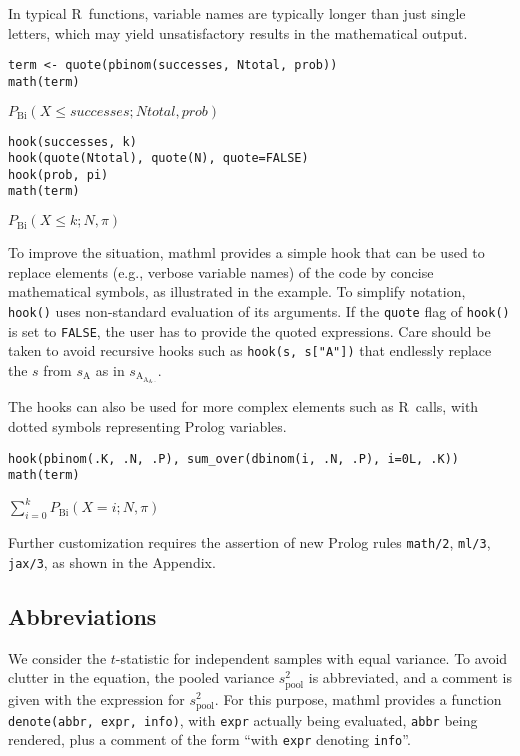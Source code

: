 In typical R~functions, variable names are typically longer than just
single letters, which may yield unsatisfactory results in the
mathematical output.

\begin{verbatim}
term <- quote(pbinom(successes, Ntotal, prob))
math(term)
\end{verbatim}

\({P}_{\mathrm{Bi}}{\left({{X}{\le}{successes}}{{;}{{Ntotal}{{,}{prob}}}}\right)}\)

\begin{verbatim}
hook(successes, k)
hook(quote(Ntotal), quote(N), quote=FALSE)
hook(prob, pi)
math(term)
\end{verbatim}

\({P}_{\mathrm{Bi}}{\left({{X}{\le}{k}}{{;}{{N}{{,}{\pi}}}}\right)}\)

To improve the situation, mathml provides a simple hook that can be used
to replace elements (e.g., verbose variable names) of the code by
concise mathematical symbols, as illustrated in the example. To simplify
notation, \texttt{hook()} uses non-standard evaluation of its arguments. If the
\texttt{quote} flag of \texttt{hook()} is set to \texttt{FALSE}, the user has to provide the
quoted expressions. Care should be taken to avoid recursive hooks such
as \texttt{hook(s,~s{[}"A"{]})} that endlessly replace the \(s\) from
\(s_{\mathrm{A}}\) as in \(s_{\mathrm{A}_{\mathrm{A}_{\mathrm{A}\cdots}}}\).

The hooks can also be used for more complex elements such as R~calls,
with dotted symbols representing Prolog variables.

\begin{verbatim}
hook(pbinom(.K, .N, .P), sum_over(dbinom(i, .N, .P), i=0L, .K))
math(term)
\end{verbatim}

\({\sum}_{{i}{=}{0}}^{k}{{P}_{\mathrm{Bi}}{\left({{X}{=}{i}}{{;}{{N}{{,}{\pi}}}}\right)}}\)

Further customization requires the assertion of new Prolog rules
\texttt{math/2}, \texttt{ml/3}, \texttt{jax/3}, as shown in the Appendix.

\hypertarget{abbreviations}{%
\subsection{Abbreviations}\label{abbreviations}}

We consider the \(t\)-statistic for independent samples with equal
variance. To avoid clutter in the equation, the pooled variance
\(s^2_{\mathrm{pool}}\) is abbreviated, and a comment is given with the
expression for \(s^2_{\mathrm{pool}}\). For this purpose, mathml provides
a function \texttt{denote(abbr,~expr,~info)}, with \texttt{expr} actually being
evaluated, \texttt{abbr} being rendered, plus a comment of the form ``with
\texttt{expr} denoting \texttt{info}''.

